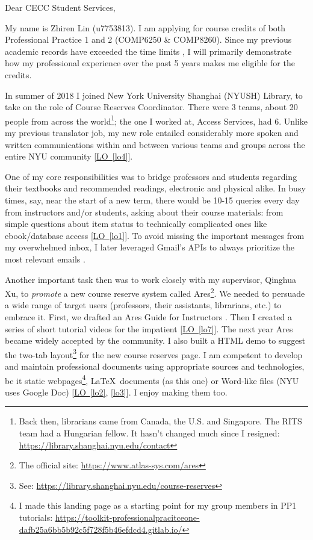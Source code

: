 \documentclass[12pt,a4paper]{article}
\newcommand{\refpp}[1]{\hyperref[#1]{LO~\ref{#1}}}
\begin{document}
Dear CECC Student Services,

My name is Zhiren Lin (u7753813).  I am applying for course credits of both Professional Practice 1 and 2 (COMP6250 \& COMP8260). Since my previous academic records have exceeded the time limits \citep[Pol.~7a]{policy7}, I will primarily demonstrate how my professional experience over the past 5 years makes me eligible for the credits.


\hypertarget{para2}{}
In summer of 2018 I joined New York University Shanghai (NYUSH) Library, to take on the role of Course Reserves Coordinator.  There were 3 teams, about 20 people from across the world\footnote{Back then, librarians came from Canada, the U.S. and Singapore. The RITS team had a Hungarian fellow. It hasn't changed much since I resigned: \url{https://library.shanghai.nyu.edu/contact}}; the one I worked at, Access Services, had 6.  Unlike my previous translator job, my new role entailed considerably more spoken and written communications within and between various teams and groups across the entire NYU community [\refpp{lo4}].


\hypertarget{para3}{}
One of my core responsibilities was to bridge professors and students regarding their textbooks and recommended readings, electronic and physical alike.  In busy times, say, near the start of a new term, there would be 10-15 queries every day from instructors and/or students, asking about their course materials: from simple questions about item status to technically complicated ones like ebook/database access [\refpp{lo1}].  To avoid missing the important messages from my overwhelmed inbox, I later leveraged Gmail’s APIs to always prioritize the most relevant emails \citep{lin2020}.

\hypertarget{para4}{}
Another important task then was to work closely with my supervisor, Qinghua Xu, to \emph{promote} a new course reserve system called Ares\footnote{The official site: \url{https://www.atlas-sys.com/ares}}. We needed to persuade a wide range of target users (professors, their assistants, librarians, etc.) to embrace it.  First, we drafted an Ares Guide for Instructors \citep{ares}.  Then I created a series of short tutorial videos for the impatient [\refpp{lo7}].  The next year Ares became widely accepted by the community.  I also built a HTML demo to suggest the two-tab layout\footnote{See: \url{https://library.shanghai.nyu.edu/course-reserves}} for the new course reserves page.  I am competent to develop and maintain professional documents using appropriate sources and technologies, be it static webpages\footnote{I made this landing page as a starting point for my group members in PP1 tutorials: \url{https://toolkit-professionalpracitceone-dafb25a6bb5b92c5f728f5b46efdcd4.gitlab.io/}}, \LaTeX\ documents (as this one) or Word-like files (NYU uses Google Doc) [\refpp{lo2}, \ref{lo3}]. I enjoy making them too.
\end{document}
